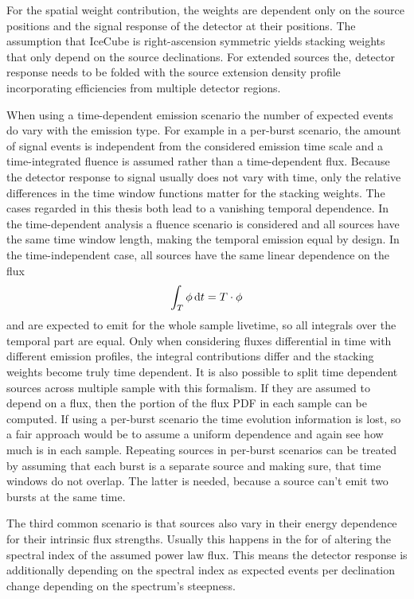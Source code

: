 For the spatial weight contribution, the weights are dependent only on the source positions and the signal response of the detector at their positions.
The assumption that IceCube is right-ascension symmetric yields stacking weights that only depend on the source declinations.
For extended sources the, detector response needs to be folded with the source extension density profile incorporating efficiencies from multiple detector regions.

When using a time-dependent emission scenario the number of expected events do vary with the emission type.
For example in a per-burst scenario, the amount of signal events is independent from the considered emission time scale and a time-integrated fluence is assumed rather than a time-dependent flux.
Because the detector response to signal usually does not vary with time, only the relative differences in the time window functions matter for the stacking weights.
The cases regarded in this thesis both lead to a vanishing temporal dependence.
In the time-dependent analysis a fluence scenario is considered and all sources have the same time window length, making the temporal emission equal by design.
In the time-independent case, all sources have the same linear dependence on the flux
\begin{equation}
  \int_T \phi \,\mathrm{d}t = T\cdot \phi
\end{equation}
and are expected to emit for the whole sample livetime, so all integrals over the temporal part are equal.
Only when considering fluxes differential in time with different emission profiles, the integral contributions differ and the stacking weights become truly time dependent.
It is also possible to split time dependent sources across multiple sample with this formalism.
If they are assumed to depend on a flux, then the portion of the flux PDF in each sample can be computed.
If using a per-burst scenario the time evolution information is lost, so a fair approach would be to assume a uniform dependence and again see how much is in each sample.
Repeating sources in per-burst scenarios can be treated by assuming that each burst is a separate source and making sure, that time windows do not overlap.
The latter is needed, because a source can't emit two bursts at the same time.

The third common scenario is that sources also vary in their energy dependence for their intrinsic flux strengths.
Usually this happens in the for of altering the spectral index of the assumed power law flux.
This means the detector response is additionally depending on the spectral index as expected events per declination change depending on the spectrum's steepness.

